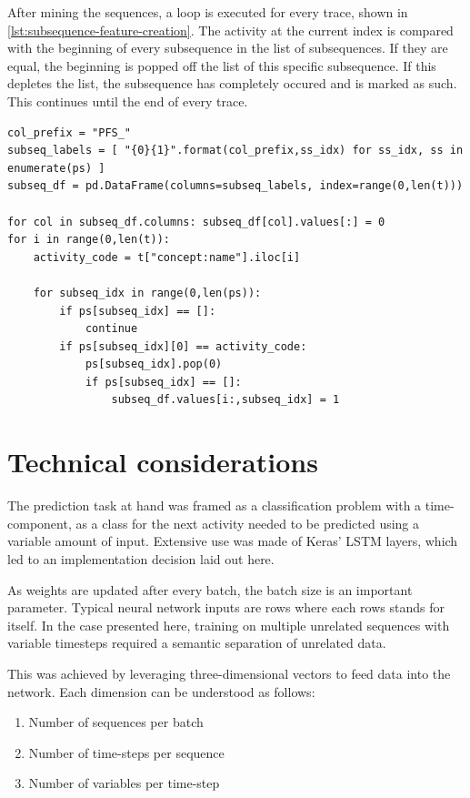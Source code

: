 After mining the sequences, a loop is executed for every trace, shown in \autoref{lst:subsequence-feature-creation}. The activity at the current index is compared with the beginning of every subsequence in the list of subsequences. If they are equal, the beginning is popped off the list of this specific subsequence. If this depletes the list, the subsequence has completely occured and is marked as such. This continues until the end of every trace.

\begin{lstlisting}[caption={Creating the subsequence features.}, label={lst:subsequence-feature-creation}]
col_prefix = "PFS_"
subseq_labels = [ "{0}{1}".format(col_prefix,ss_idx) for ss_idx, ss in enumerate(ps) ]
subseq_df = pd.DataFrame(columns=subseq_labels, index=range(0,len(t)))

for col in subseq_df.columns: subseq_df[col].values[:] = 0
for i in range(0,len(t)):
    activity_code = t["concept:name"].iloc[i]
    
    for subseq_idx in range(0,len(ps)):
        if ps[subseq_idx] == []:
            continue
        if ps[subseq_idx][0] == activity_code:
            ps[subseq_idx].pop(0)
            if ps[subseq_idx] == []:
                subseq_df.values[i:,subseq_idx] = 1
\end{lstlisting}


\section{Technical considerations}
The prediction task at hand was framed as a classification problem with a time-component, as a class for the next activity needed to be predicted using a variable amount of input. Extensive use was made of Keras' LSTM layers, which led to an implementation decision laid out here.

As weights are updated after every batch, the batch size is an important parameter. Typical neural network inputs are rows where each rows stands for itself. In the case presented here, training on multiple unrelated sequences with variable timesteps required a semantic separation of unrelated data.

This was achieved by leveraging three-dimensional vectors to feed data into the network. Each dimension can be understood as follows:

\begin{enumerate}
    \item Number of sequences per batch
    \item Number of time-steps per sequence
    \item Number of variables per time-step
\end{enumerate}

